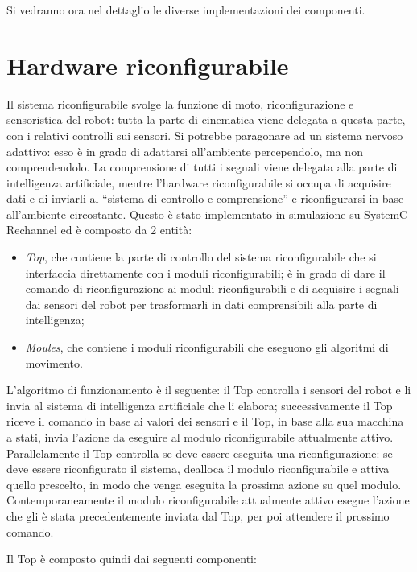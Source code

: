 \documentclass[a4paper,titlepage]{book}
\begin{document}
Si vedranno ora nel dettaglio le diverse implementazioni dei componenti.

\section{Hardware riconfigurabile}

Il sistema riconfigurabile svolge la funzione di moto, riconfigurazione e sensoristica del robot: tutta la parte di cinematica viene delegata a questa parte, con i relativi controlli sui sensori. Si potrebbe paragonare ad un sistema nervoso adattivo: esso è in grado di adattarsi all'ambiente percependolo, ma non comprendendolo. La comprensione di tutti i segnali viene delegata alla parte di intelligenza artificiale, mentre l'hardware riconfigurabile si occupa di acquisire dati e di inviarli al ``sistema di controllo e comprensione'' e riconfigurarsi in base all'ambiente circostante.
Questo è stato implementato in simulazione su SystemC Rechannel ed è composto da 2 entità:

\begin{itemize}
  \item \textit{Top}, che contiene la parte di controllo del sistema riconfigurabile che si interfaccia direttamente con i moduli riconfigurabili; è in grado di dare il comando di riconfigurazione ai moduli riconfigurabili e di acquisire i segnali dai sensori del robot per trasformarli in dati comprensibili alla parte di intelligenza;
  \item \textit{Moules}, che contiene i moduli riconfigurabili che eseguono gli algoritmi di movimento.
\end{itemize}

L'algoritmo di funzionamento è il seguente: il Top controlla i sensori del robot e li invia al sistema di intelligenza artificiale che li elabora; successivamente il Top riceve il comando in base ai valori dei sensori e il Top, in base alla sua macchina a stati, invia l'azione da eseguire al modulo riconfigurabile attualmente attivo.
Parallelamente il Top controlla se deve essere eseguita una riconfigurazione: se deve essere riconfigurato il sistema, dealloca il modulo riconfigurabile e attiva quello prescelto, in modo che venga eseguita la prossima azione su quel modulo.
Contemporaneamente il modulo riconfigurabile attualmente attivo esegue l'azione che gli è stata precedentemente inviata dal Top, per poi attendere il prossimo comando.

Il Top è composto quindi dai seguenti componenti:
\end{document}
